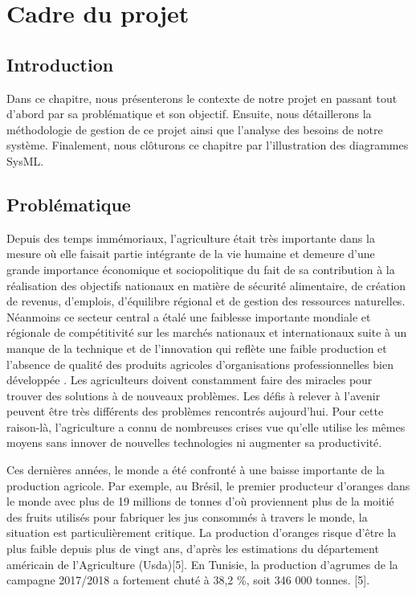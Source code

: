 

	\chapter{Cadre du projet }
	\newpage
	
	
	\section{Introduction }
	Dans ce chapitre, nous présenterons le contexte de notre projet en passant tout d'abord par sa  problématique et son objectif. Ensuite, nous détaillerons la méthodologie de gestion de ce projet ainsi que l'analyse des besoins de notre système. Finalement, nous clôturons ce chapitre par l'illustration des diagrammes SysML.
	
	\section{Problématique }
	Depuis des temps immémoriaux, l'agriculture était très importante dans la mesure où elle faisait partie intégrante de la vie humaine et demeure d'une grande importance économique et sociopolitique du fait de sa contribution à la réalisation des objectifs nationaux en matière de sécurité alimentaire, de création de revenus, d'emplois, d'équilibre régional et de gestion des ressources naturelles. Néanmoins ce secteur central a étalé une faiblesse importante mondiale et régionale de compétitivité sur les marchés nationaux et internationaux suite à un manque de la technique et de l'innovation qui reflète une faible production et l'absence de qualité des produits agricoles d'organisations professionnelles bien développée . Les agriculteurs doivent constamment faire des miracles pour trouver des solutions à de nouveaux problèmes. Les défis à relever à l'avenir peuvent être très différents des problèmes rencontrés aujourd'hui. Pour cette raison-là, l'agriculture a connu de nombreuses crises vue qu'elle utilise les mêmes moyens sans innover de nouvelles technologies ni augmenter sa productivité.
	
	Ces dernières années, le monde a été confronté à une baisse importante de la production agricole. Par exemple, au Brésil, le premier producteur d'oranges dans le monde avec plus de 19 millions de tonnes d'où proviennent plus de la moitié des fruits utilisés pour fabriquer les jus consommés à travers le monde, la situation est particulièrement critique. La production d'oranges risque d'être la plus faible depuis plus de vingt ans, d'après les estimations du département américain de l'Agriculture (Usda)[5]. En Tunisie, la production d'agrumes de la campagne 2017/2018 a fortement chuté à 38,2 \%, soit 346 000 tonnes. [5].
	
